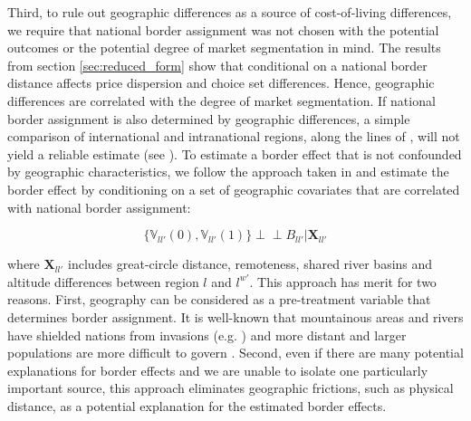 Third, to rule out geographic differences as a source of cost-of-living differences, we require that national border assignment was not chosen with the potential outcomes or the potential degree of market segmentation in mind. The results from section \ref{sec:reduced_form} show that conditional on a national border distance affects price dispersion and choice set differences. Hence, geographic differences are correlated with the degree of market segmentation. If national border assignment is also determined by geographic differences, a simple comparison of international and intranational regions, along the lines of \citet{Engel1996}, will not yield a reliable estimate (see \citet{Gorodnichenko2009}). To estimate a border effect that is not confounded by geographic characteristics, we follow the approach taken in \citet{Santamaria2021} and estimate the border effect by conditioning on a set of geographic covariates that are correlated with national border assignment:
\begin{linenomath*}
    \begin{equation*}
        \{\mathbb{V}_{ll'}(0),\mathbb{V}_{ll'}(1)\} \perp \!\!\! \perp B_{ll'} | \boldsymbol{X}_{ll'} 
    \end{equation*}
\end{linenomath*}
where $\boldsymbol{X}_{ll'}$ includes great-circle distance, remoteness, shared river basins and altitude differences between region $l$ and $l^{w'}$. This approach has merit for two reasons. First, geography can be considered as a pre-treatment variable that determines border assignment. It is well-known that mountainous areas and rivers have shielded nations from invasions (e.g. \citet{Nunn2012}) and more distant and larger populations are more difficult to govern \citet{Alesina1997}. Second, even if there are many potential explanations for border effects and we are unable to isolate one particularly important source, this approach eliminates geographic frictions, such as physical distance, as a potential explanation for the estimated border effects. 

